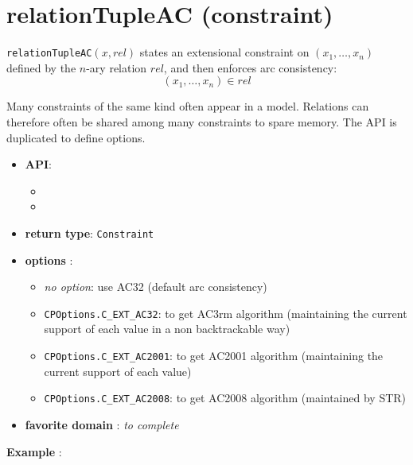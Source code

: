 \label{relationtupleac}
\hypertarget{relationtupleac}{}

\section{relationTupleAC (constraint)}\label{relationtupleac:relationtupleacconstraint}\hypertarget{relationtupleac:relationtupleacconstraint}{}
\begin{notedef}
  \texttt{relationTupleAC}$(x,rel)$ states an extensional constraint on $(x_1,\ldots,x_n)$ defined by the $n$-ary relation $rel$, and then enforces arc consistency:
$$(x_1,\ldots,x_n)\in rel$$
\end{notedef}
Many constraints of the same kind often appear in a model. Relations can therefore often be shared among many constraints to spare memory.
The API is duplicated to define options.

\begin{itemize}
	\item \textbf{API}:
	\begin{itemize}
		\item {}
		\item {}
	\end{itemize}
	\item \textbf{return type}: \texttt{Constraint}
	\item \textbf{options} :
	\begin{itemize}
		\item \emph{no option}: use AC32 (default arc consistency)
		\item \texttt{CPOptions.C_EXT_AC32}: to get AC3rm algorithm (maintaining the current support of each value in a non backtrackable way)
		\item \texttt{CPOptions.C_EXT_AC2001}: to get AC2001 algorithm (maintaining the current support of each value)
		\item \texttt{CPOptions.C_EXT_AC2008}: to get AC2008 algorithm (maintained by STR)
	\end{itemize}
	\item \textbf{favorite domain} : \emph{to complete}
\end{itemize}

\textbf{Example} :

